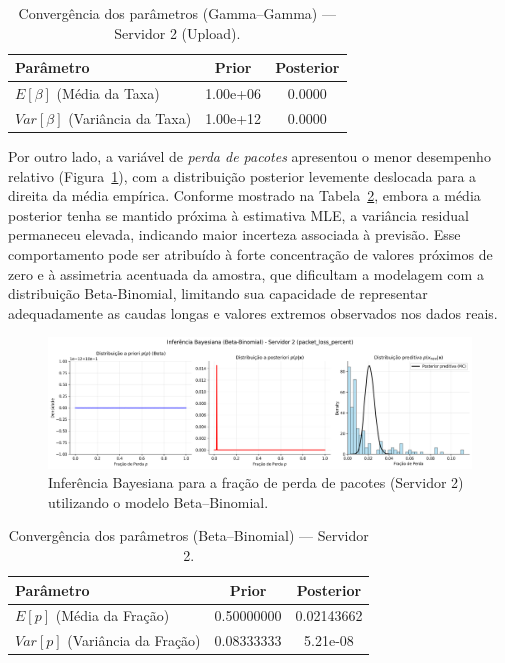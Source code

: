 \documentclass{article}
\begin{document}
\begin{table}[H]
	\centering
	\caption{Convergência dos parâmetros (Gamma–Gamma) — Servidor 2 (Upload).}
	\label{tab:bayes_gamma_upload_server02}
	\begin{tabular}{lcc}
		\hline
		\textbf{Parâmetro} & \textbf{Prior} & \textbf{Posterior} \\ \hline
		$E[\beta]$ (Média da Taxa) & 1.00e+06 & 0.0000 \\
		$Var[\beta]$ (Variância da Taxa) & 1.00e+12 & 0.0000 \\ \hline
	\end{tabular}
\end{table}

Por outro lado, a variável de \textit{perda de pacotes} apresentou o menor desempenho relativo (Figura~\ref{fig:packet_loss_percent_bayesian_betabinomial_server02}), com a distribuição posterior levemente deslocada para a direita da média empírica.
Conforme mostrado na Tabela~\ref{tab:bayes_beta_server02}, embora a média posterior tenha se mantido próxima à estimativa MLE, a variância residual permaneceu elevada, indicando maior incerteza associada à previsão.
Esse comportamento pode ser atribuído à forte concentração de valores próximos de zero e à assimetria acentuada da amostra, que dificultam a modelagem com a distribuição Beta-Binomial, limitando sua capacidade de representar adequadamente as caudas longas e valores extremos observados nos dados reais.

\begin{figure}[htp!]
	\centering
	\includegraphics[width=\textwidth]{../figures/bayes/packet_loss_percent_bayesian_betabinomial_server02.png}
	\caption{Inferência Bayesiana para a fração de perda de pacotes (Servidor 2) utilizando o modelo Beta–Binomial.}
	\label{fig:packet_loss_percent_bayesian_betabinomial_server02}
\end{figure}

\begin{table}[htp]
	\centering
	\caption{Convergência dos parâmetros (Beta–Binomial) — Servidor 2.}
	\label{tab:bayes_beta_server02}
	\begin{tabular}{lcc}
		\hline
		\textbf{Parâmetro} & \textbf{Prior} & \textbf{Posterior} \\ \hline
		$E[p]$ (Média da Fração) & 0.50000000 & 0.02143662 \\
		$Var[p]$ (Variância da Fração) & 0.08333333 & 5.21e-08 \\ \hline
	\end{tabular}
\end{table}
\end{document}

